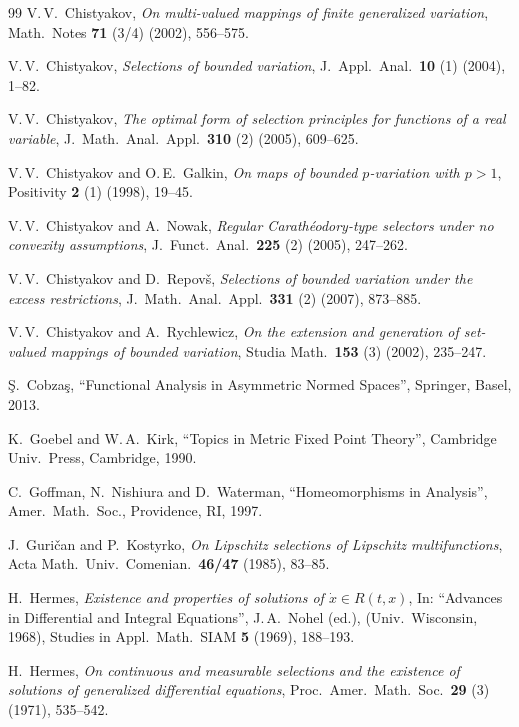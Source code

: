 \documentclass[preprint,12pt]{elsarticle}
\begin{document}
\begin{thebibliography}{99}
V.\,V.~Chistyakov,
{\it On multi-valued mappings of finite generalized variation},
Math.\ Notes {\bf 71} (3/4) (2002), 556--575.

V.\,V.~Chistyakov,
{\it Selections of bounded variation},
J.\ Appl.\ Anal.\ {\bf 10} (1) (2004), 1--82.

V.\,V.~Chistyakov,
{\it The optimal form of selection principles for functions of a real variable},
J.\ Math.\ Anal.\ Appl.\ {\bf 310} (2) (2005), 609--625.

V.\,V.~Chistyakov and O.\,E.~Galkin,
{\it On maps of bounded $p$-variation with $p>1$},
Positivity {\bf 2} (1) (1998), 19--45.

V.\,V.~Chistyakov and A.~Nowak,
{\it Regular Carath{\'e}odory-type selectors under no convexity assumptions},
J.\ Funct.\ Anal.\ {\bf 225} (2) (2005), \mbox{247--262}.

V.\,V.~Chistyakov and D.~Repov{\v s},
{\it Selections of bounded variation under the excess restrictions},
J.\ Math.\ Anal.\ Appl.\ {\bf 331} (2) (2007), 873--885.

V.\,V.~Chistyakov and A.~Rychlewicz,
{\it On the extension and generation of set-valued mappings of bounded variation},
Studia Math.\ {\bf 153} (3) (2002), 235--247.

{\c S}.~Cobza{\c s},
``Functional Analysis in Asymmetric Normed Spaces'',
Springer, Basel, 2013.

K.~Goebel and W.\,A.~Kirk,
``Topics in Metric Fixed Point Theory'',
Cambridge Univ.\ Press, Cambridge, 1990.

C.~Goffman, N.~Nishiura and D.~Waterman,
``Homeomorphisms in Analysis'',
Amer.\ Math.\ Soc., Providence, RI, 1997.

J.~Guri{\v c}an and P.~Kostyrko,
{\it On Lipschitz selections of Lipschitz multifunctions},
Acta Math.\ Univ.\ Comenian.\ {\bf 46/47} (1985), 83--85.

H.~Hermes,
{\it Existence and properties of solutions of $\dot x\in R(t,x)$},
In: ``Advances in Differential and Integral Equations'', J.\,A.~Nohel (ed.), 
(Univ.\ Wisconsin, 1968), Studies in Appl.\ Math.\ SIAM {\bf 5} (1969), \mbox{188--193}.

H.~Hermes,
{\it On continuous and measurable selections and the existence of solutions
  of generalized differential equations},
Proc.\ Amer.\ Math.\ Soc.\ {\bf 29} (3) (1971), 535--542.


\end{thebibliography}
\end{document}
